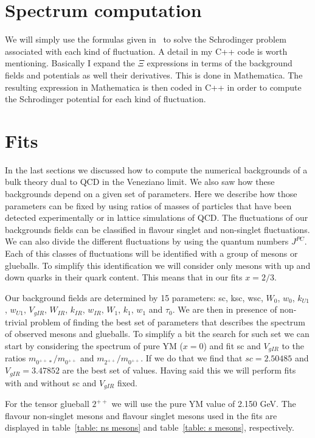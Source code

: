 \documentclass[a4paper,12pt]{article}
\begin{document}
\section{Spectrum computation}
We will simply use the formulas given in~\cite{Arean:2013tja} to solve the Schrodinger problem associated with each kind of fluctuation. A detail in my C++ code is worth mentioning. Basically I expand the $\Xi$ expressions in terms of the background fields and potentials as well their derivatives. This is done in Mathematica. The resulting expression in Mathematica is then coded in C++ in order to compute the Schrodinger potential for each kind of fluctuation.



\section{Fits}

In the last sections we discussed how to compute the numerical backgrounds of a bulk theory dual to QCD in the Veneziano limit. We also saw how these backgrounds depend on a given set of parameters. Here we describe how those parameters can be fixed by using ratios of masses of particles that have been detected experimentally or in lattice simulations of QCD. The fluctuations of our backgrounds fields can be classified in flavour singlet and non-singlet fluctuations. We can also divide the different  fluctuations by using the quantum numbers $J^{PC}$.  Each of this classes of fluctuations will be identified with a group of mesons or glueballs. To simplify this identification we will consider only mesons with up and down quarks in their quark content. This means that in our fits $x = 2 / 3$.

Our background fields are determined by 15 parameters: sc, ksc, wsc, $W_0$, $w_0$, $k_{U1}$, $w_{U1}$, $V_{gIR}$, $W_{IR}$, $k_{IR}$, $w_{IR}$, $W_1$, $k_1$, $w_1$ and $\tau_0$. We are then in presence of non-trivial problem of finding the best set of parameters that describes the spectrum of observed mesons and glueballs. To simplify a bit the search for such set we can start by considering the spectrum of pure YM ($x = 0$) and fit sc and $V_{gIR}$ to the ratios $m_{0^{++}*} / m_{0^{++}}$ and $m_{2^{++}}/m_{0^{++}}$. If we do that we find that $sc = 2.50485$ and $V_{gIR} = 3.47852$ are the best set of values. Having said this we will perform fits with and without sc and $V_{gIR}$ fixed.

For the tensor glueball $2^{++}$ we will use the pure YM value of 2.150 GeV. The flavour non-singlet mesons and flavour singlet mesons used in the fits are displayed in table~\ref{table: ns mesons} and table~\ref{table: s mesons}, respectively.
\end{document}
